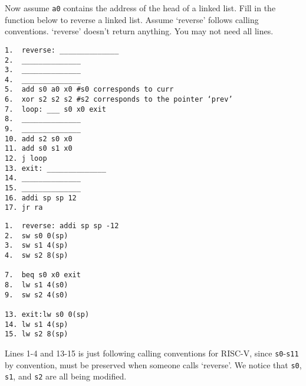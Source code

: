 \begin{blocksection}
\question
Now assume \lstinline$a0$ contains the address of the head of a linked list.  Fill in the function 
below to reverse a linked list. Assume ‘reverse’ follows calling conventions. ‘reverse’ doesn’t return anything. You may not need all lines. 

\begin{verbatim}
1.  reverse: ______________
2.  ______________
3.  ______________
4.  ______________
5.  add s0 a0 x0 #s0 corresponds to curr
6.  xor s2 s2 s2 #s2 corresponds to the pointer ‘prev’ 
7.  loop: ___ s0 x0 exit
8.  ______________
9.  ______________
10. add s2 s0 x0 
11. add s0 s1 x0 
12. j loop 
13. exit: ______________
14. ______________
15. ______________
16. addi sp sp 12
17. jr ra
\end{verbatim}

\begin{solution}[4in]
\begin{verbatim}
1.  reverse: addi sp sp -12
2.  sw s0 0(sp) 
3.  sw s1 4(sp) 
4.  sw s2 8(sp) 

7.  beq s0 x0 exit
8.  lw s1 4(s0)
9.  sw s2 4(s0)

13. exit:lw s0 0(sp)
14. lw s1 4(sp)
15. lw s2 8(sp)
\end{verbatim}

Lines 1-4 and 13-15 is just following calling conventions for RISC-V, since \lstinline$s0$-\lstinline$s11$ by convention, must be preserved when someone calls ‘reverse’. We notice that \lstinline$s0$, \lstinline$s1$, and \lstinline$s2$ are all being modified.

\end{solution}
\end{blocksection}